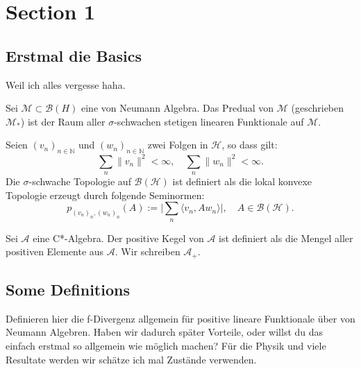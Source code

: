 \section{Section 1}


\subsection{Erstmal die Basics}
Weil ich alles vergesse haha.

\begin{definition}
    Sei $\mathcal{M}\subset \mathcal{B}(H)$ eine von Neumann Algebra.
    Das Predual von $\mathcal{M}$ (geschrieben $\mathcal{M}_*$)
    ist der Raum aller $\sigma$-schwachen stetigen
    linearen Funktionale auf $\mathcal{M}$.
\end{definition}


\begin{definition}
    Seien $(v_n)_{n\in\mathbb{N}}$ und $(w_n)_{n\in\mathbb{N}}$
    zwei Folgen in $\mathcal{H}$, so dass gilt:
    \begin{equation}
        \sum_{n}\lVert v_n \rVert^2 < \infty,\quad
        \sum_{n}\lVert w_n \rVert^2 < \infty.
    \end{equation}
    Die $\sigma$-schwache Topologie auf $\mathcal{B(H)}$ ist definiert als
    die lokal konvexe Topologie erzeugt durch folgende
    Seminormen:
    \begin{equation}
        p_{(v_n)_n, (w_n)_n}(A) := \lvert \sum_{n} \langle v_n, A w_n\rangle \rvert,
        \quad A\in\mathcal{B(H)}.
    \end{equation}
\end{definition}

\begin{definition}
    Sei $\mathcal{A}$ eine C*-Algebra.
    Der positive Kegel von $\mathcal{A}$ ist definiert als die Mengel aller
    positiven Elemente aus $\mathcal{A}$. Wir schreiben $\mathcal{A}_+$.
\end{definition}



\subsection{Some Definitions}


\begin{question}
    Definieren hier die f-Divergenz allgemein für positive lineare Funktionale
    über von Neumann Algebren.
    Haben wir dadurch später Vorteile, oder willst du das einfach erstmal
    so allgemein wie möglich machen?
    Für die Physik und viele Resultate werden wir schätze ich mal Zustände
    verwenden.
\end{question}


